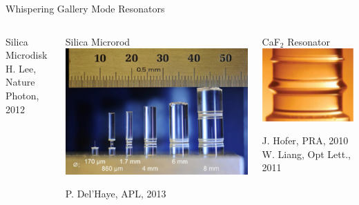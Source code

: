 \documentclass{beamer}
\begin{document}
\begin{frame}{Whispering Gallery Mode Resonators}
\begin{columns}
\begin{block}{Silica Microdisk}
\scriptsize
H. Lee, Nature Photon, 2012
\end{block}

\begin{block}{Silica Microrod}
\includegraphics[width=1.0\textwidth]{Images/Microrods.png}

\scriptsize
P. Del'Haye, APL, 2013
\end{block}

\begin{block}{CaF$_2$ Resonator}
\includegraphics[width=1.0\textwidth]{Images/CaF2_resonator.png}

\scriptsize
J. Hofer, PRA, 2010\\
W. Liang, Opt Lett., 2011
\end{block}
\end{columns}
\end{frame}
\end{document}
